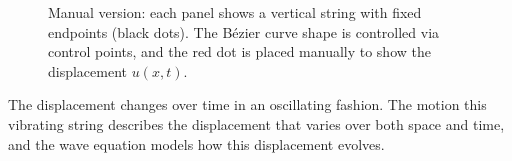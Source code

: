 \begin{figure}[H]
  \centering
  \caption{Manual version: each panel shows a vertical string with fixed endpoints (black dots). The Bézier curve shape is controlled via control points, and the red dot is placed manually to show the displacement \( u(x, t) \).}
\end{figure}

\vspace{1.5em}


The displacement changes over time in an oscillating fashion. The motion this vibrating string describes the displacement that varies over both space and time, and the wave equation models how this displacement evolves.


